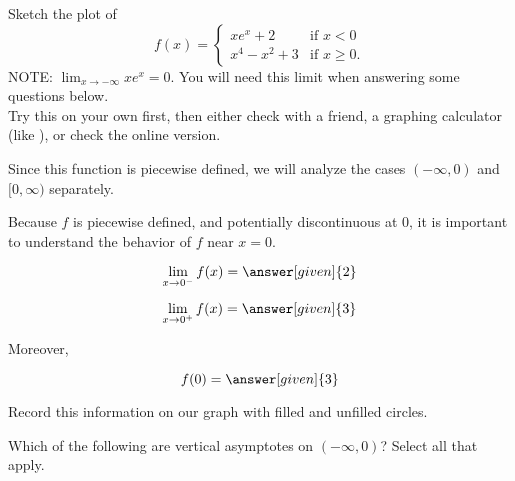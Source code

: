 \documentclass[wordchoicegiven]{ximera}
\begin{document}
\begin{example}
Sketch the plot of 
\[
f(x) = \begin{cases} xe^x+2 &\text{if $x<0$} \\
x^4-x^2+3 &\text{if $x \geq 0$}.
\end{cases}
\]
NOTE: $\lim_{x \to -\infty}xe^x=0$. You will need this limit when answering some questions below.\\
 Try this on your own first, then either check with a friend, a graphing calculator (like ), or check the online version.


	Since this function is piecewise defined, we will analyze the cases $(-\infty,0)$ and $[0,\infty)$ separately.

	Because $f$ is piecewise defined, and potentially discontinuous at $0$, it is important to understand the behavior of $f$ near $x = 0$.
	
	\[
		\lim_{x \to 0^-} f(x) = \answer[given]{2}
	\]
	
	\[
		\lim_{x \to 0^+} f(x) = \answer[given]{3}
	\]
	
	Moreover, 
	
	\[
	f(0) = \answer[given]{3}
	\]
	
	Record this information on our graph with filled and unfilled circles.

	\begin{image}
\end{image}
	
Which of the following are vertical asymptotes on $(-\infty,0)$?  Select all that apply.

\begin{selectAll}
\end{selectAll}


\end{example}
\end{document}
